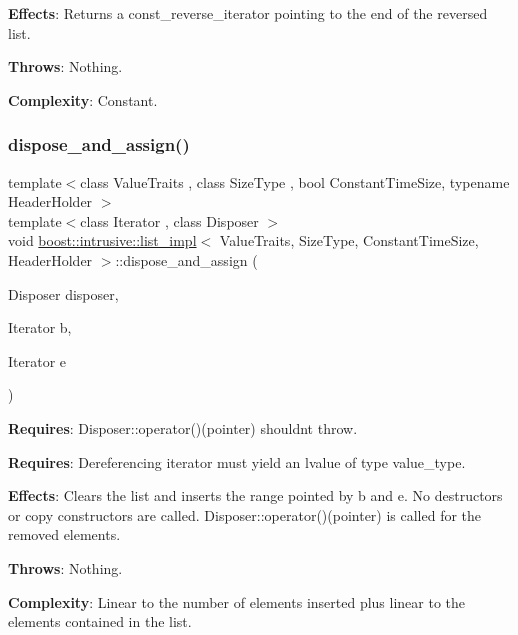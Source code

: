 {\bfseries Effects}\+: Returns a const\+\_\+reverse\+\_\+iterator pointing to the end of the reversed list.

{\bfseries Throws}\+: Nothing.

{\bfseries Complexity}\+: Constant. \mbox{\label{classboost_1_1intrusive_1_1list__impl_a00ddf26d859cd22fdb3b2355e8af1cd8}} 
\subsubsection{\texorpdfstring{dispose\+\_\+and\+\_\+assign()}{dispose\_and\_assign()}}
{\footnotesize\ttfamily template$<$class Value\+Traits , class Size\+Type , bool Constant\+Time\+Size, typename Header\+Holder $>$ \\
template$<$class Iterator , class Disposer $>$ \\
void \hyperlink{classboost_1_1intrusive_1_1list__impl}{boost\+::intrusive\+::list\+\_\+impl}$<$ Value\+Traits, Size\+Type, Constant\+Time\+Size, Header\+Holder $>$\+::dispose\+\_\+and\+\_\+assign (\begin{DoxyParamCaption}\item[{Disposer}]{disposer,  }\item[{Iterator}]{b,  }\item[{Iterator}]{e }\end{DoxyParamCaption})\hspace{0.3cm}{\ttfamily [inline]}}

{\bfseries Requires}\+: Disposer\+::operator()(pointer) shouldn\textquotesingle{}t throw.

{\bfseries Requires}\+: Dereferencing iterator must yield an lvalue of type value\+\_\+type.

{\bfseries Effects}\+: Clears the list and inserts the range pointed by b and e. No destructors or copy constructors are called. Disposer\+::operator()(pointer) is called for the removed elements.

{\bfseries Throws}\+: Nothing.

{\bfseries Complexity}\+: Linear to the number of elements inserted plus linear to the elements contained in the list.

